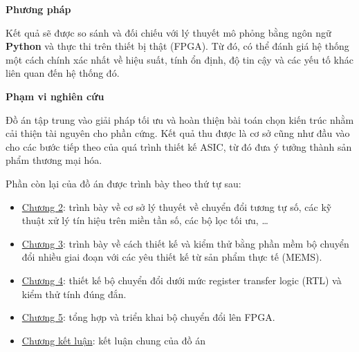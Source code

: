 \noindent \textbf{Phương pháp}

Kết quả sẽ được so sánh và đối chiếu với lý thuyết  mô phỏng bằng ngôn ngữ \textbf{Python} và thực thi trên thiết bị thật (FPGA). Từ đó, có thể đánh giá hệ thống một cách chính xác nhất về hiệu suất, tính ổn định, độ tin cậy và các yếu tố khác liên quan đến hệ thống đó.

\noindent \textbf{Phạm vi nghiên cứu}

Đồ án tập trung vào giải pháp tối ưu và hoàn thiện bài toán chọn kiến trúc nhằm cải thiện tài nguyên cho phần cứng. Kết quả thu được là cơ sở cũng như đầu vào cho các bước tiếp theo của quá trình thiết kế ASIC, từ đó đưa ý tưởng thành sản phẩm thương mại hóa.

\noindent Phần còn lại của đồ án được trình bày theo thứ tự sau:
\begin{itemize}
    \item \hyperref[chuong2]{Chương 2}: trình bày về cơ sở lý thuyết về chuyển đổi tương tự số, các kỹ thuật xử lý tín hiệu trên miền tần số, các bộ lọc tối ưu, \ldots
    \item \hyperref[chuong3]{Chương 3}: trình bày về cách thiết kế và kiểm thử bằng phần mềm bộ chuyển đổi nhiều giai đoạn với các yêu thiết kế từ sản phẩm thực tế (MEMS).
    \item \hyperref[chuong4]{Chương 4}: thiết kế bộ chuyển đổi dưới mức register transfer logic (RTL) và kiểm thử tính đúng đắn.
    \item \hyperref[chuong5]{Chương 5}: tổng hợp và triển khai bộ chuyển đổi lên FPGA.
    \item \hyperref[ketluan]{Chương kết luận}: kết luận chung của đồ án
\end{itemize}
\newpage